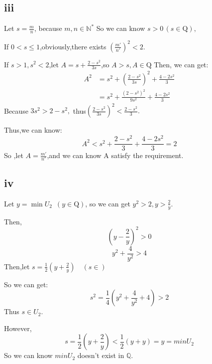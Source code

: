 \documentclass[11pt,twoside,a4paper]{article}
\begin{document}
\subsection{iii}
Let  $\displaystyle s=\frac{m}{n}$,  because  $m,n \in \mathbb{N}^* $
So we can know  $s>0\,(s \in \mathrm{Q}) ,$\par\noindent
If $0<s\le1$,obviously,there exists $\displaystyle (\frac{m'}{n'})^2<2$.\par\noindent
If $s>1,s^2<2$,let $\displaystyle A = s + \frac{2-s^2}{3s}$,so  $A>s,A \in\mathrm{Q}$
Then, we can get:
\begin{align*}
 A^2&=s^2+(\frac{2-s^2}{3s})^2+\frac{4-2s^2}{3} 
\\&=s^2+\frac{(2-s^2)^2}{9s^2}+\frac{4-2s^2}{3}
\end{align*}
Because $3s^2>2-s^2,$ thus$\displaystyle (\frac{2-s^2}{3s})^2<\frac{2-s^2}{3}.$\par\noindent
Thus,we can know:
$$A^2<s^{2}+\frac{2-s^{2}}{3}+\frac{4-2 s^{2}}{3}=2 $$
So ,let $\displaystyle A=\frac{m'}{n'}$,and we can know A satisfy the requirement.





\subsection{iv}
Let$\,\,y=\min U_{2}\,\,\,(y \in  \mathrm{Q}) $, so we can get 
$\displaystyle y^{2}>2, y>\frac{2}{y} $.
\par\noindent  Then,$$(y-\frac{2}{y})^{2}>0$$ $$ y^{2}+\frac{4}{y^{2}}>4 $$
Then,let 
$\displaystyle s=\frac{1}{2}(y+\frac{2}{y}) \quad (s \in ) $\par\noindent
So we can get:$$ s^{2}=\frac{1}{4}(y^{2}+\frac{4}{y^{2}}+4) >2 $$ Thus$\,\,s \in  U_{2}$.\par\noindent
However,
$$s=\frac{1}{2}(y+\frac{2}{y})<\frac{1}{2}(y+y) =y=minU_{2}$$
So we can know $minU{_2}\,\,$doesn't exist in $\mathbb{Q}$.
\end{document}
